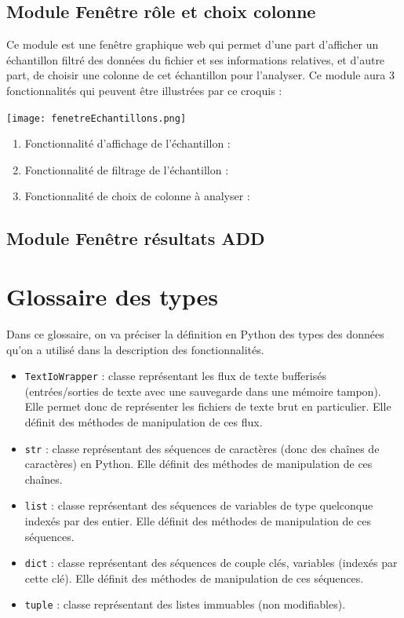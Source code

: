 		\subsection{Module Fenêtre rôle et choix colonne}
			Ce module est une fenêtre graphique web qui permet d'une part d'afficher un échantillon filtré des données du fichier et ses informations relatives, et d'autre part, de choisir une colonne de cet échantillon pour l'analyser. Ce module aura 3 fonctionnalités qui peuvent être illustrées par ce croquis :
			\begin{center}\texttt{[image: fenetreEchantillons.png]}\end{center}
			\begin{enumerate}
				\vspace{1em}\item Fonctionnalité d'affichage de l'échantillon :
				\vspace{1em}\item Fonctionnalité de filtrage de l'échantillon :
				\vspace{1em}\item Fonctionnalité de choix de colonne à analyser :
			\end{enumerate}
			
			
		\subsection{Module Fenêtre résultats ADD}
	
	\section{Glossaire des types}
		Dans ce glossaire, on va préciser la définition en Python des types des données qu'on a utilisé dans la description des fonctionnalités.
		\begin{itemize}
			\item \lstinline!TextIoWrapper! : classe représentant les flux de texte bufferisés (entrées/sorties de texte avec une sauvegarde dans une mémoire tampon). Elle permet donc de représenter les fichiers de texte brut en particulier. Elle définit des méthodes de manipulation de ces flux.
			\item \lstinline!str! : classe représentant des séquences de caractères (donc des chaînes de caractères) en Python. Elle définit des méthodes de manipulation de ces chaînes.
			\item \lstinline!list! : classe représentant des séquences de variables de type quelconque indexés par des entier. Elle définit des méthodes de manipulation de ces séquences.		
			\item \lstinline!dict! : classe représentant des séquences de couple clés, variables (indexés par cette clé). Elle définit des méthodes de manipulation de ces séquences.		
			\item \lstinline!tuple! : classe représentant des listes immuables (non modifiables).
		\end{itemize}
	
